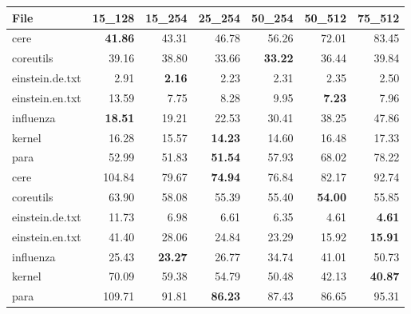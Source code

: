 \documentclass[english,twoside,censored,csm,algorithms-track-2020]{HYthesisML}
\theoremstyle{plain}
\theoremstyle{definition}
\numberwithin{testexample}{chapter}
\begin{document}
\begin{center}
  \begin{table}[t]
  \begin{tabular} {|l|r r r r r r|}
    \hline
     \textbf{File} & \textbf{15\_128} & \textbf{15\_254} & \textbf{25\_254}  &\textbf{50\_254} & \textbf{50\_512} & \textbf{75\_512} \\
     \hline

     cere            & \textbf{41.86} & 43.31          & 46.78          & 56.26          & 72.01          & 83.45 \\
     coreutils       & 39.16          & 38.80          & 33.66          & \textbf{33.22} & 36.44           & 39.84 \\
     einstein.de.txt & 2.91           & \textbf{2.16}  & 2.23           & 2.31           & 2.35           & 2.50  \\
     einstein.en.txt & 13.59          & 7.75           & 8.28           & 9.95           & \textbf{7.23}  & 7.96  \\
     influenza       & \textbf{18.51} & 19.21          & 22.53          & 30.41          & 38.25          & 47.86 \\
     kernel          & 16.28          & 15.57          & \textbf{14.23} & 14.60          & 16.48          & 17.33 \\
     para            & 52.99          & 51.83          & \textbf{51.54} & 57.93          & 68.02          & 78.22 \\

     \hline

     cere            & 104.84 & 79.67          & \textbf{74.94} & 76.84 & 82.17          & 92.74          \\
     coreutils       & 63.90  & 58.08          & 55.39          & 55.40 & \textbf{54.00} & 55.85          \\
     einstein.de.txt & 11.73  & 6.98           & 6.61           & 6.35  & 4.61           & \textbf{4.61}  \\
     einstein.en.txt & 41.40  & 28.06          & 24.84          & 23.29 & 15.92          & \textbf{15.91} \\
     influenza       & 25.43  & \textbf{23.27} & 26.77          & 34.74 & 41.01          & 50.73          \\
     kernel          & 70.09  & 59.38          & 54.79          & 50.48 & 42.13          & \textbf{40.87} \\
     para            & 109.71 & 91.81          & \textbf{86.23} & 87.43 & 86.65          & 95.31          \\
     

\end{tabular}
\end{table}
\end{center}
\end{document}
